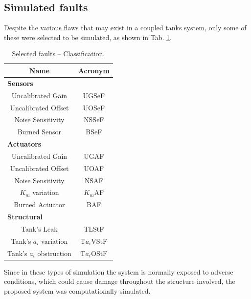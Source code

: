 \documentclass[10pt,fleqn,a4paper]{article}
\begin{document}
\subsection{Simulated faults}
Despite the various flaws that may exist in a coupled tanks system, only some of
these were selected to be simulated, as shown in Tab. \ref{tab:faults}.

\begin{table}[!htb]
\centering
\caption{Selected faults -- Classification.}
\label{tab:faults}
\begin{tabular}{|c|c|}
\hline
{\bf Name} & {\bf Acronym}\\
\hline
\multicolumn{2}{|l|}{\bf Sensors}\\
\hline
Uncalibrated Gain & UGSeF\\
\hline
Uncalibrated Offset & UOSeF\\
\hline
Noise Sensitivity & NSSeF\\
\hline
Burned Sensor & BSeF\\
\hline
\multicolumn{2}{|l|}{\bf Actuators}\\
\hline
Uncalibrated Gain & UGAF\\
\hline
Uncalibrated Offset & UOAF\\
\hline
Noise Sensitivity & NSAF\\
\hline
$K_m$ variation & $K_m$AF\\
\hline
Burned Actuator & BAF\\
\hline
\multicolumn{2}{|l|}{\bf Structural}\\
\hline
Tank's Leak & TLStF\\
\hline
Tank's $a_i$ variation & T$a_i$VStF\\
\hline
Tank's $a_i$ obstruction & T$a_i$OStF\\
\hline
\end{tabular}
\end{table}

Since in these types of simulation the system is normally exposed to adverse
conditions, which could cause damage throughout the structure involved, the
proposed system was computationally simulated.
\end{document}
